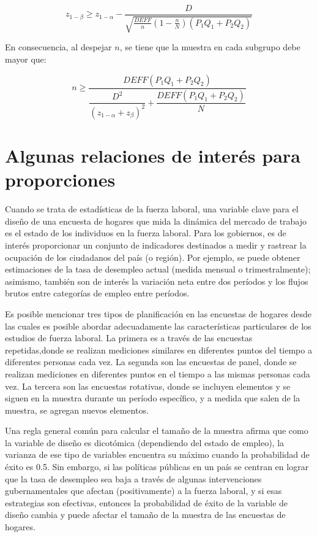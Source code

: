\documentclass[
  12pt,
]{book}
\begin{document}
\[
z_{1-\beta} \geq z_{1-\alpha} - \dfrac{D}{\sqrt{\frac{DEFF}{n}\left(1-\frac{n}{N}\right)(P_1Q_1+P_2Q_2)}} 
\]

En consecuencia, al despejar \(n\), se tiene que la muestra en cada subgrupo debe mayor que:

\[
n \geq \dfrac{DEFF(P_1Q_1+P_2Q_2)}{\dfrac{D^2}{(z_{1-\alpha}+z_{\beta})^2}+\dfrac{DEFF(P_1Q_1+P_2Q_2)}{N}}
\]

\hypertarget{algunas-relaciones-de-interuxe9s-para-proporciones}{%
\section{Algunas relaciones de interés para proporciones}\label{algunas-relaciones-de-interuxe9s-para-proporciones}}

Cuando se trata de estadísticas de la fuerza laboral, una variable clave para el diseño de una encuesta de hogares que mida la dinámica del mercado de trabajo es el estado de los individuos en la fuerza laboral. Para los gobiernos, es de interés proporcionar un conjunto de indicadores destinados a medir y rastrear la ocupación de los ciudadanos del país (o región). Por ejemplo, se puede obtener estimaciones de la tasa de desempleo actual (medida mensual o trimestralmente); asimismo, también son de interés la variación neta entre dos períodos y los flujos brutos entre categorías de empleo entre períodos.

Es posible mencionar tres tipos de planificación en las encuestas de hogares desde las cuales es posible abordar adecuadamente las características particulares de los estudios de fuerza laboral. La primera es a través de las encuestas repetidas,donde se realizan mediciones similares en diferentes puntos del tiempo a diferentes personas cada vez. La segunda son las encuestas de panel, donde se realizan mediciones en diferentes puntos en el tiempo a las mismas personas cada vez. La tercera son las encuestas rotativas, donde se incluyen elementos y se siguen en la muestra durante un período específico, y a medida que salen de la muestra, se agregan nuevos elementos.

Una regla general común para calcular el tamaño de la muestra afirma que como la variable de diseño es dicotómica (dependiendo del estado de empleo), la varianza de ese tipo de variables encuentra su máximo cuando la probabilidad de éxito es 0.5. Sin embargo, si las políticas públicas en un país se centran en lograr que la tasa de desempleo sea baja a través de algunas intervenciones gubernamentales que afectan (positivamente) a la fuerza laboral, y si esas estrategias son efectivas, entonces la probabilidad de éxito de la variable de diseño cambia y puede afectar el tamaño de la muestra de las encuestas de hogares.
\end{document}
